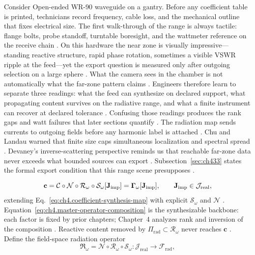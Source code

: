 \begin{physicalvignette}
Consider Open-ended WR-90 waveguide on a gantry. Before any coefficient table is printed, technicians record frequency, cable loss, and the mechanical outline that fixes electrical size. The first walk-through of the range is always tactile: flange bolts, probe standoff, turntable boresight, and the wattmeter reference on the receive chain \cite{hansen1988}.
On this hardware the near zone is visually impressive---standing reactive structure, rapid phase rotation, sometimes a visible VSWR ripple at the feed---yet the export question is measured only after outgoing selection on a large sphere \cite{harrington2001}. What the camera sees in the chamber is not automatically what the far-zone pattern claims \cite{stratton1941}.
Engineers therefore learn to separate three readings: what the feed can synthesize on declared support, what propagating content survives on the radiative range, and what a finite instrument can recover at declared tolerance \cite{devaney2004}. Confusing those readings produces the rank gaps and watt failures that later sections quantify \cite{pal2026}.
The radiation map sends currents to outgoing fields before any harmonic label is attached . 
Chu and Landau warned that finite size caps simultaneous localization and spectral spread \cite{chu1948}. Devaney's inverse-scattering perspective reminds us that reachable far-zone data never exceeds what bounded sources can export \cite{devaney2004}.
Subsection~\ref{sec:ch433} states the formal export condition that this range scene presupposes \cite{stratton1941}.
\end{physicalvignette}
\begin{equation}
\label{eq:ch4.master-operator-composition}
\mathbf{c}
=
\mathcal{C}\circ\mathcal{N}\circ\mathcal{R}_\omega\circ\mathcal{S}_\omega[\mathbf{J}_{\mathrm{imp}}]
=
\boldsymbol{\Gamma}_\omega[\mathbf{J}_{\mathrm{imp}}],
\qquad
\mathbf{J}_{\mathrm{imp}}\in\mathcal{J}_{\mathrm{real}},
\end{equation}
extending Eq.~\eqref{eq:ch4.coefficient-synthesis-map} with explicit \(\mathcal{S}_\omega\) and \(\mathcal{N}\)
\cite{stratton1941}. Equation~\eqref{eq:ch4.master-operator-composition} is the synthesizable backbone:
each factor is fixed by prior chapters; Chapter~4 analyzes rank and inversion of the composition
\cite{devaney2004}. Reactive content removed by \(\Pi_{\mathrm{rad}}\subset\mathcal{R}_\omega\) never reaches
\(\mathbf{c}\) \cite{stratton1941}.
Define the field-space radiation operator
\begin{equation}
\label{eq:ch4.field-radiation-operator}
\mathfrak{R}_\omega
=
\mathcal{N}\circ\mathcal{R}_\omega\circ\mathcal{S}_\omega:
\mathcal{J}_{\mathrm{real}}\to\mathcal{F}_{\mathrm{rad}},
\end{equation}
